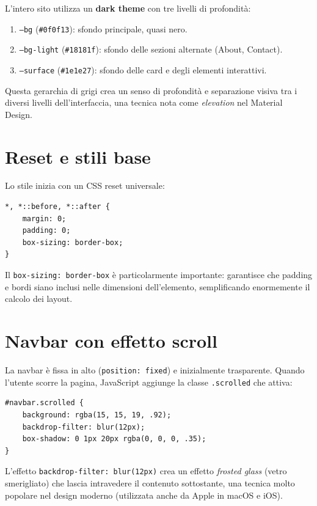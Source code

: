\documentclass[a4paper,12pt]{report}
\begin{document}
L'intero sito utilizza un \textbf{dark theme} con tre livelli di profondit\`a:
\begin{enumerate}[leftmargin=2cm]
    \item \texttt{--bg} (\texttt{\#0f0f13}): sfondo principale, quasi nero.
    \item \texttt{--bg-light} (\texttt{\#18181f}): sfondo delle sezioni alternate (About, Contact).
    \item \texttt{--surface} (\texttt{\#1e1e27}): sfondo delle card e degli elementi interattivi.
\end{enumerate}

Questa gerarchia di grigi crea un senso di profondit\`a e separazione visiva tra i diversi livelli dell'interfaccia, una tecnica nota come \textit{elevation} nel Material Design.

\section{Reset e stili base}

Lo stile inizia con un CSS reset universale:

\begin{lstlisting}[style=cssstyle, caption={CSS Reset}]
*, *::before, *::after {
    margin: 0;
    padding: 0;
    box-sizing: border-box;
}
\end{lstlisting}

Il \texttt{box-sizing: border-box} \`e particolarmente importante: garantisce che padding e bordi siano inclusi nelle dimensioni dell'elemento, semplificando enormemente il calcolo dei layout.

\section{Navbar con effetto scroll}

La navbar \`e fissa in alto (\texttt{position: fixed}) e inizialmente trasparente. Quando l'utente scorre la pagina, JavaScript aggiunge la classe \texttt{.scrolled} che attiva:

\begin{lstlisting}[style=cssstyle, caption={Effetto navbar scrolled}]
#navbar.scrolled {
    background: rgba(15, 15, 19, .92);
    backdrop-filter: blur(12px);
    box-shadow: 0 1px 20px rgba(0, 0, 0, .35);
}
\end{lstlisting}

L'effetto \texttt{backdrop-filter: blur(12px)} crea un effetto \textit{frosted glass} (vetro smerigliato) che lascia intravedere il contenuto sottostante, una tecnica molto popolare nel design moderno (utilizzata anche da Apple in macOS e iOS).
\end{document}
